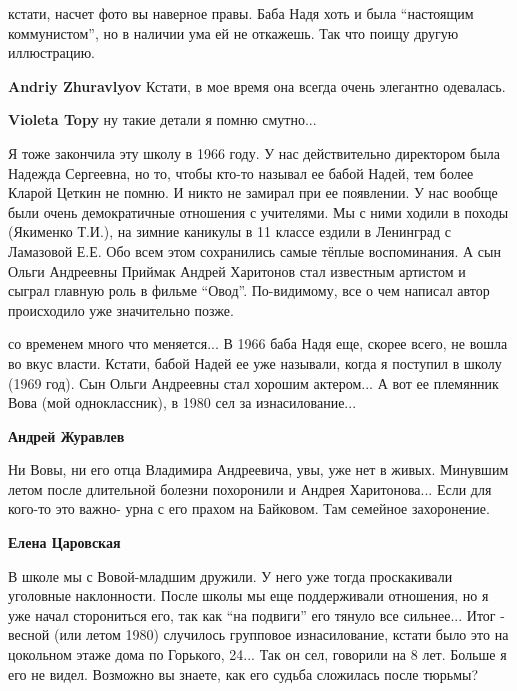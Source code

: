 \begin{itemize}
\begin{itemize}
\begin{itemize}
кстати, насчет фото вы наверное правы. Баба Надя хоть и была \enquote{настоящим
коммунистом}, но в наличии ума ей не откажешь. Так что поищу другую
иллюстрацию.

\textbf{Andriy Zhuravlyov} Кстати, в мое время она всегда очень элегантно одевалась.

\textbf{Violeta Topy} ну такие детали я помню смутно...
\end{itemize} %

\end{itemize} %


Я тоже закончила эту школу в 1966 году. У нас действительно директором была
Надежда Сергеевна, но то, чтобы кто-то называл ее бабой Надей, тем более Кларой
Цеткин не помню. И никто не замирал при ее появлении. У нас вообще были очень
демократичные отношения с учителями. Мы с ними ходили в походы (Якименко
Т.И.), на зимние каникулы в 11 классе ездили в Ленинград с Ламазовой Е.Е. Обо
всем этом сохранились самые тёплые воспоминания. А сын Ольги Андреевны Приймак
Андрей Харитонов стал известным артистом и сыграл главную роль в
фильме \enquote{Овод}. По-видимому, все о чем написал автор происходило уже значительно
позже.

\begin{itemize} %

со временем много что меняется... В 1966 баба Надя еще, скорее всего, не вошла
во вкус власти. Кстати, бабой Надей ее уже называли, когда я поступил в школу
(1969 год). Сын Ольги Андреевны стал хорошим актером... А вот ее племянник Вова
(мой одноклассник), в 1980 сел за изнасилование...

\begin{itemize} %
\textbf{Андрей Журавлев} 

Ни Вовы, ни его отца Владимира Андреевича, увы, уже нет в живых. Минувшим летом
после длительной болезни похоронили и Андрея Харитонова... Если для кого-то это
важно- урна с его прахом на Байковом. Там семейное захоронение.


\textbf{Елена Царовская} 

В школе мы с Вовой-младшим дружили. У него уже тогда проскакивали уголовные
наклонности. После школы мы еще поддерживали отношения, но я уже начал
сторониться его, так как \enquote{на подвиги} его тянуло все сильнее... Итог - весной
(или летом 1980) случилось групповое изнасилование, кстати было это на
цокольном этаже дома по Горького, 24... Так он сел, говорили на 8 лет. Больше я
его не видел. Возможно вы знаете, как его судьба сложилась после тюрьмы?


\end{itemize}
\end{itemize}
\end{itemize}
